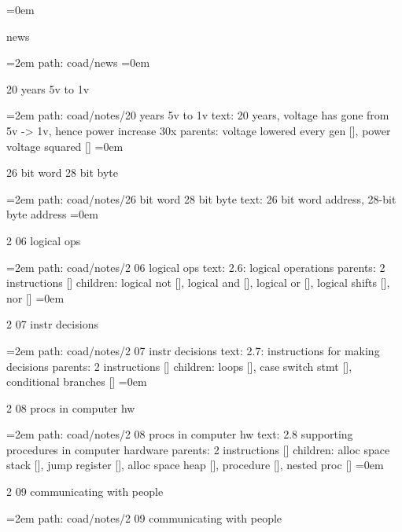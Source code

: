\smallskip
\leftskip=0em
\par\endgroup
\bigskip
{}
news
\smallskip
\par\begingroup
\leftskip=2em
path: coad/news
\smallskip
\leftskip=0em
\par\endgroup
\bigskip
{}
20 years 5v to 1v
\smallskip
\par\begingroup
\leftskip=2em
path: coad/notes/20 years 5v to 1v
\smallskip
text:  20 years, voltage has gone from 5v -> 1v, hence power increase 30x
\smallskip
parents:  voltage lowered every gen [], power voltage squared []
\smallskip
\leftskip=0em
\par\endgroup
\bigskip
{}
26 bit word 28 bit byte
\smallskip
\par\begingroup
\leftskip=2em
path: coad/notes/26 bit word 28 bit byte
\smallskip
text:  26 bit word address, 28-bit byte address
\smallskip
\leftskip=0em
\par\endgroup
\bigskip
{}
2 06 logical ops
\smallskip
\par\begingroup
\leftskip=2em
path: coad/notes/2 06 logical ops
\smallskip
text:  2.6: logical operations
\smallskip
parents:  2 instructions []
\smallskip
children: logical not [], logical and [], logical or [], logical shifts [], nor []
\smallskip
\leftskip=0em
\par\endgroup
\bigskip
{}
2 07 instr decisions
\smallskip
\par\begingroup
\leftskip=2em
path: coad/notes/2 07 instr decisions
\smallskip
text:  2.7: instructions for making decisions
\smallskip
parents:  2 instructions []
\smallskip
children: loops [], case switch stmt [], conditional branches []
\smallskip
\leftskip=0em
\par\endgroup
\bigskip
{}
2 08 procs in computer hw
\smallskip
\par\begingroup
\leftskip=2em
path: coad/notes/2 08 procs in computer hw
\smallskip
text:  2.8 supporting procedures in computer hardware
\smallskip
parents:  2 instructions []
\smallskip
children: alloc space stack [], jump register [], alloc space heap [], procedure [], nested proc []
\smallskip
\leftskip=0em
\par\endgroup
\bigskip
{}
2 09 communicating with people
\smallskip
\par\begingroup
\leftskip=2em
path: coad/notes/2 09 communicating with people
